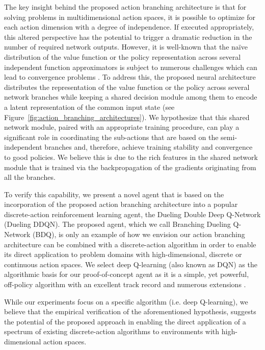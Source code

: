 \documentclass[letterpaper]{article}
\newcommand{\citep}{\cite}
\begin{document}
The key insight behind the proposed action branching architecture is that for solving problems in multidimensional action spaces, it is possible to optimize for each action dimension with a degree of independence. If executed appropriately, this altered perspective has the potential to trigger a dramatic reduction in the number of required network outputs. However, it is well-known that the na{\"i}ve distribution of the value function or the policy representation across several independent function approximators is subject to numerous challenges which can lead to convergence problems \citep{Matignon:2012independent}.
To address this, the proposed neural architecture distributes the representation of the value function or the policy across several network branches while keeping a shared decision module among them to encode a latent representation of the common input state (see Figure~\ref{fig:action_branching_architectures}). We hypothesize that this shared network module, paired with an appropriate training procedure, can play a significant role in coordinating the sub-actions that are based on the semi-independent branches and, therefore, achieve training stability and convergence to good policies. We believe this is due to the rich features in the shared network module that is trained via the backpropagation of the gradients originating from all the branches.

To verify this capability, we present a novel agent that is based on the incorporation of the proposed action branching architecture into a popular discrete-action reinforcement learning agent, the Dueling Double Deep Q-Network (Dueling DDQN). The proposed agent, which we call Branching Dueling Q-Network (BDQ), is only an example of how we envision our action branching architecture can be combined with a discrete-action algorithm in order to enable its direct application to problem domains with high-dimensional, discrete or continuous action spaces. We select deep Q-learning (also known as DQN) as the algorithmic basis for our proof-of-concept agent as it is a simple, yet powerful, off-policy algorithm with an excellent track record and numerous extensions \citep{Hessel:2017Rainbow}.

While our experiments focus on a specific algorithm (i.e. deep Q-learning), we believe that the empirical verification of the aforementioned hypothesis, suggests the potential of the proposed approach in enabling the direct application of a spectrum of existing discrete-action algorithms to environments with high-dimensional action spaces.
\end{document}
